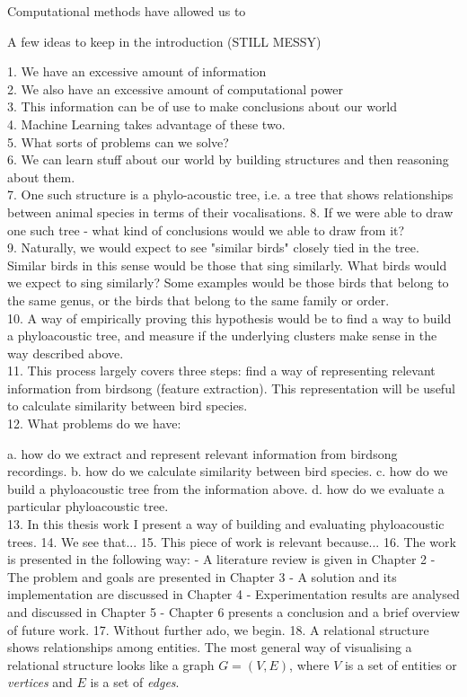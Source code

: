 \documentclass[../main.tex]{subfiles}
\begin{document}
Computational methods have allowed us to 



A few ideas to keep in the introduction (STILL MESSY)

1. We have an excessive amount of information\\
2. We also have an excessive amount of computational power\\
3. This information can be of use to make conclusions about our world\\
4. Machine Learning takes advantage of these two.\\
5. What sorts of problems can we solve? \\
6. We can learn stuff about our world by building structures and then reasoning about them. \\
7. One such structure is a phylo-acoustic tree, i.e. a tree that shows relationships between animal species in terms of their vocalisations. 
8. If we were able to draw one such tree - what kind of conclusions would we able to draw from it? \\
9. Naturally, we would expect to see "similar birds" closely tied in the tree. Similar birds in this sense would be those that sing similarly. What birds would we expect to sing similarly? Some examples would be those birds that belong to the same genus, or the birds that belong to the same family or order. \\
10. A way of empirically proving this hypothesis would be to find a way to build a phyloacoustic tree, and measure if the underlying clusters make sense in the way described above.\\
11. This process largely covers three steps: find a way of representing relevant information from birdsong (feature extraction). This representation will be useful to calculate similarity between bird species. \\
12. What problems do we have:

a. how do we extract and represent relevant information from birdsong recordings.
b. how do we calculate similarity between bird species.
c. how do we build a phyloacoustic tree from the information above.
d. how do we evaluate a particular phyloacoustic tree.\\
13. In this thesis work I present a way of building and evaluating phyloacoustic trees. 
14. We see that...
15. This piece of work is relevant because...
16. The work is presented in the following way:
- A literature review is given in Chapter 2
- The problem and goals are presented in Chapter 3
- A solution and its implementation are discussed in Chapter 4
- Experimentation results are analysed and discussed in Chapter 5
- Chapter 6 presents a conclusion and a brief overview of future work.
17. Without further ado, we begin. \cite{Awatade2012}
18. A relational structure shows relationships among entities. The most general way of visualising a relational structure looks like a graph $G = (V, E)$, where $V$ is a set of entities or \emph{vertices} and $E$ is a set of \emph{edges}. 
\end{document}
